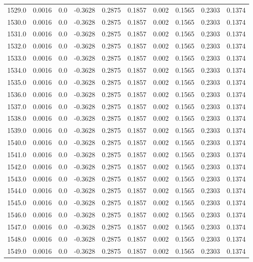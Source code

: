 \begin{longtable}{lrrrrrrrrr}
1529.0 & 0.0016 & 0.0 & -0.3628 & 0.2875 & 0.1857 & 0.002 & 0.1565 & 0.2303 & 0.1374 \\
1530.0 & 0.0016 & 0.0 & -0.3628 & 0.2875 & 0.1857 & 0.002 & 0.1565 & 0.2303 & 0.1374 \\
1531.0 & 0.0016 & 0.0 & -0.3628 & 0.2875 & 0.1857 & 0.002 & 0.1565 & 0.2303 & 0.1374 \\
1532.0 & 0.0016 & 0.0 & -0.3628 & 0.2875 & 0.1857 & 0.002 & 0.1565 & 0.2303 & 0.1374 \\
1533.0 & 0.0016 & 0.0 & -0.3628 & 0.2875 & 0.1857 & 0.002 & 0.1565 & 0.2303 & 0.1374 \\
1534.0 & 0.0016 & 0.0 & -0.3628 & 0.2875 & 0.1857 & 0.002 & 0.1565 & 0.2303 & 0.1374 \\
1535.0 & 0.0016 & 0.0 & -0.3628 & 0.2875 & 0.1857 & 0.002 & 0.1565 & 0.2303 & 0.1374 \\
1536.0 & 0.0016 & 0.0 & -0.3628 & 0.2875 & 0.1857 & 0.002 & 0.1565 & 0.2303 & 0.1374 \\
1537.0 & 0.0016 & 0.0 & -0.3628 & 0.2875 & 0.1857 & 0.002 & 0.1565 & 0.2303 & 0.1374 \\
1538.0 & 0.0016 & 0.0 & -0.3628 & 0.2875 & 0.1857 & 0.002 & 0.1565 & 0.2303 & 0.1374 \\
1539.0 & 0.0016 & 0.0 & -0.3628 & 0.2875 & 0.1857 & 0.002 & 0.1565 & 0.2303 & 0.1374 \\
1540.0 & 0.0016 & 0.0 & -0.3628 & 0.2875 & 0.1857 & 0.002 & 0.1565 & 0.2303 & 0.1374 \\
1541.0 & 0.0016 & 0.0 & -0.3628 & 0.2875 & 0.1857 & 0.002 & 0.1565 & 0.2303 & 0.1374 \\
1542.0 & 0.0016 & 0.0 & -0.3628 & 0.2875 & 0.1857 & 0.002 & 0.1565 & 0.2303 & 0.1374 \\
1543.0 & 0.0016 & 0.0 & -0.3628 & 0.2875 & 0.1857 & 0.002 & 0.1565 & 0.2303 & 0.1374 \\
1544.0 & 0.0016 & 0.0 & -0.3628 & 0.2875 & 0.1857 & 0.002 & 0.1565 & 0.2303 & 0.1374 \\
1545.0 & 0.0016 & 0.0 & -0.3628 & 0.2875 & 0.1857 & 0.002 & 0.1565 & 0.2303 & 0.1374 \\
1546.0 & 0.0016 & 0.0 & -0.3628 & 0.2875 & 0.1857 & 0.002 & 0.1565 & 0.2303 & 0.1374 \\
1547.0 & 0.0016 & 0.0 & -0.3628 & 0.2875 & 0.1857 & 0.002 & 0.1565 & 0.2303 & 0.1374 \\
1548.0 & 0.0016 & 0.0 & -0.3628 & 0.2875 & 0.1857 & 0.002 & 0.1565 & 0.2303 & 0.1374 \\
1549.0 & 0.0016 & 0.0 & -0.3628 & 0.2875 & 0.1857 & 0.002 & 0.1565 & 0.2303 & 0.1374 \\

\end{longtable}
